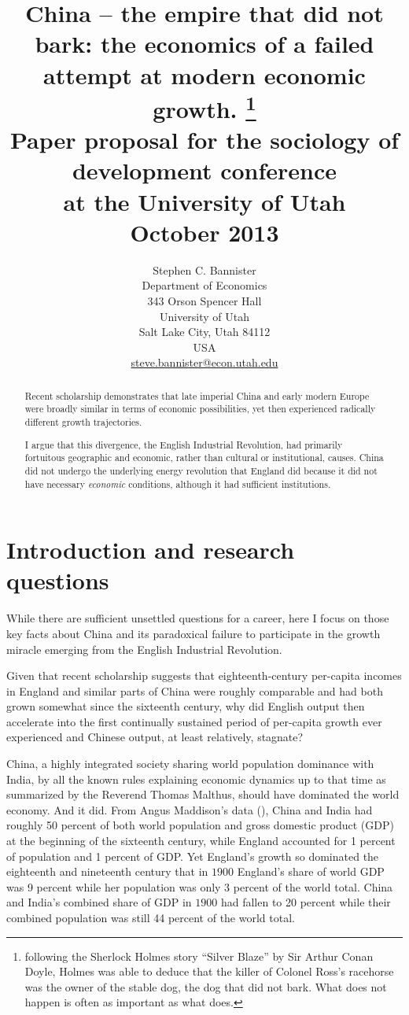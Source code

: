 \documentclass[12pt]{article}
\title{China -- the empire that did not bark: the economics of a failed attempt at modern economic growth. \footnote{following the Sherlock Holmes story ``Silver Blaze'' by Sir Arthur Conan Doyle, Holmes was able to deduce that the killer of Colonel Ross's racehorse was the owner of the stable dog, the dog that did not bark. What does not happen is often as important as what does.}\\ Paper proposal for the sociology of development conference\\at the University of Utah\\October 2013 \\
}
\author{Stephen C. Bannister\\
	Department of Economics\\
	343 Orson Spencer Hall\\
	University of Utah\\
	Salt Lake City, Utah 84112\\
	USA\\
	\href{mailto:steve.bannister@econ.utah.edu}{steve.bannister@econ.utah.edu}\\
	}
\date{}
\numberwithin{equation}{section}
\begin{document}

\graphicspath{{../images/}}

%
	\maketitle

\newpage
	\begin{abstract}
	Recent scholarship demonstrates that late imperial China and early modern Europe were broadly similar in terms of economic possibilities, yet then experienced radically different growth trajectories.
	
	I argue that this divergence, the English Industrial Revolution, had primarily fortuitous geographic and economic, rather than cultural or institutional, causes. China did not undergo the underlying energy revolution that England did because it did not have necessary \textit{economic} conditions, although it had sufficient institutions.
	\end{abstract}
	\section*{Introduction and research questions}
	While there are sufficient unsettled questions for a career, here I focus on those key facts about China and its paradoxical failure to participate in the growth miracle emerging from the English Industrial Revolution.

	Given that recent scholarship suggests that eighteenth-century per-capita incomes in England and similar parts of China were roughly comparable and had both grown somewhat since the sixteenth century, why did English output then accelerate into the first continually sustained period of per-capita growth ever experienced and Chinese output, at least relatively, stagnate? 
	
	China, a highly integrated society sharing world population dominance with India, by all the known rules explaining economic dynamics up to that time as summarized by the Reverend Thomas Malthus, should have dominated the world economy. And it did. From Angus Maddison's data (\citeyear{maddison_maddison_2010}), China and India had roughly 50 percent of both world population and gross domestic product (GDP) at the beginning of the sixteenth century, while England accounted for 1 percent of population and 1 percent of GDP. Yet England's growth so dominated the eighteenth and nineteenth century that in $1900$ England's share of world GDP was 9 percent while her population was only 3 percent of the world total. China and India's combined share of GDP in $1900$ had fallen to 20 percent while their combined population was still 44 percent of the world total. %
	
\end{document}
